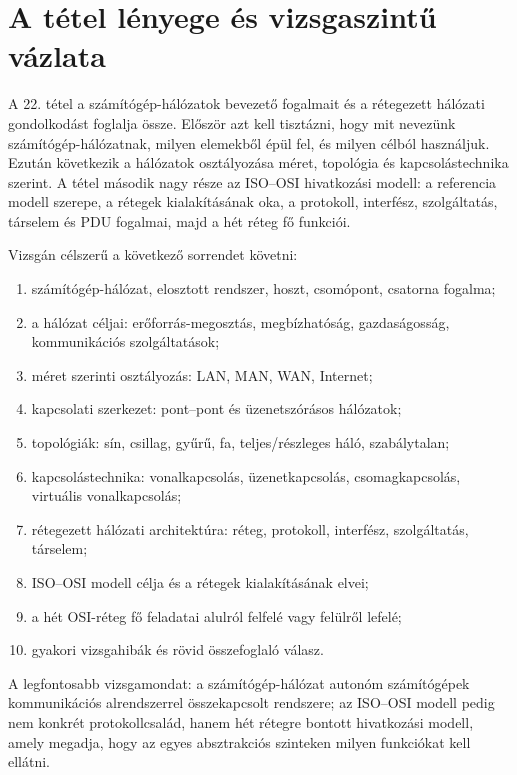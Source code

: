 \section{A tétel lényege és vizsgaszintű vázlata}

\begin{summarybox}
A 22. tétel a számítógép-hálózatok bevezető fogalmait és a rétegezett hálózati gondolkodást foglalja össze. Először azt kell tisztázni, hogy mit nevezünk számítógép-hálózatnak, milyen elemekből épül fel, és milyen célból használjuk. Ezután következik a hálózatok osztályozása méret, topológia és kapcsolástechnika szerint. A tétel második nagy része az ISO--OSI hivatkozási modell: a referencia modell szerepe, a rétegek kialakításának oka, a protokoll, interfész, szolgáltatás, társelem és PDU fogalmai, majd a hét réteg fő funkciói.
\end{summarybox}

Vizsgán célszerű a következő sorrendet követni:

\begin{enumerate}
  \item számítógép-hálózat, elosztott rendszer, hoszt, csomópont, csatorna fogalma;
  \item a hálózat céljai: erőforrás-megosztás, megbízhatóság, gazdaságosság, kommunikációs szolgáltatások;
  \item méret szerinti osztályozás: LAN, MAN, WAN, Internet;
  \item kapcsolati szerkezet: pont--pont és üzenetszórásos hálózatok;
  \item topológiák: sín, csillag, gyűrű, fa, teljes/részleges háló, szabálytalan;
  \item kapcsolástechnika: vonalkapcsolás, üzenetkapcsolás, csomagkapcsolás, virtuális vonalkapcsolás;
  \item rétegezett hálózati architektúra: réteg, protokoll, interfész, szolgáltatás, társelem;
  \item ISO--OSI modell célja és a rétegek kialakításának elvei;
  \item a hét OSI-réteg fő feladatai alulról felfelé vagy felülről lefelé;
  \item gyakori vizsgahibák és rövid összefoglaló válasz.
\end{enumerate}

A legfontosabb vizsgamondat: a számítógép-hálózat autonóm számítógépek kommunikációs alrendszerrel összekapcsolt rendszere; az ISO--OSI modell pedig nem konkrét protokollcsalád, hanem hét rétegre bontott hivatkozási modell, amely megadja, hogy az egyes absztrakciós szinteken milyen funkciókat kell ellátni.

